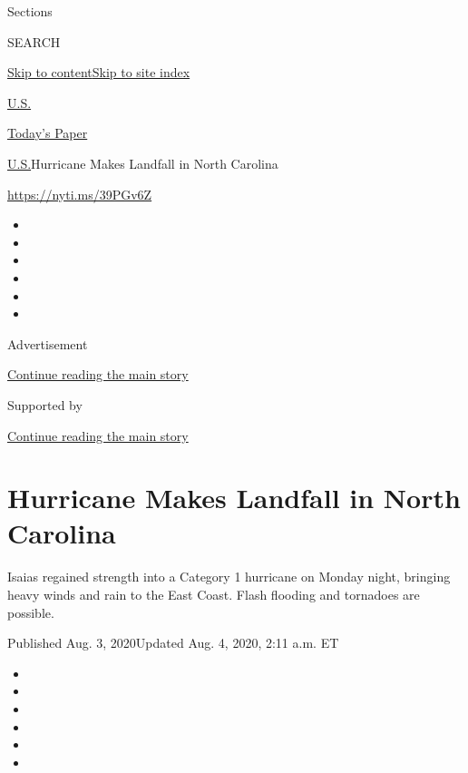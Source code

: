 Sections

SEARCH

\protect\hyperlink{site-content}{Skip to
content}\protect\hyperlink{site-index}{Skip to site index}

\href{https://www.nytimes3xbfgragh.onion/section/us}{U.S.}

\href{https://myaccount.nytimes3xbfgragh.onion/auth/login?response_type=cookie\&client_id=vi}{}

\href{https://www.nytimes3xbfgragh.onion/section/todayspaper}{Today's
Paper}

\href{/section/us}{U.S.}\textbar{}Hurricane Makes Landfall in North
Carolina

\url{https://nyti.ms/39PGv6Z}

\begin{itemize}
\item
\item
\item
\item
\item
\item
\end{itemize}

Advertisement

\protect\hyperlink{after-top}{Continue reading the main story}

Supported by

\protect\hyperlink{after-sponsor}{Continue reading the main story}

\hypertarget{hurricane-makes-landfall-in-north-carolina}{%
\section{Hurricane Makes Landfall in North
Carolina}\label{hurricane-makes-landfall-in-north-carolina}}

Isaias regained strength into a Category 1 hurricane on Monday night,
bringing heavy winds and rain to the East Coast. Flash flooding and
tornadoes are possible.

Published Aug. 3, 2020Updated Aug. 4, 2020, 2:11 a.m. ET

\begin{itemize}
\item
\item
\item
\item
\item
\item
\end{itemize}

